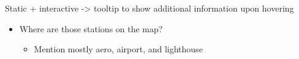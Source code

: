 \documentclass[
]{jss}
\providecommand{\tightlist}{%
  \setlength{\itemsep}{0pt}\setlength{\parskip}{0pt}}
\begin{document}
Static + interactive -\textgreater{} tooltip to show additional
information upon hovering

\begin{itemize}
\tightlist
\item
  Where are those stations on the map?

  \begin{itemize}
  \tightlist
  \item
    Mention mostly aero, airport, and lighthouse
  \end{itemize}
\end{itemize}

\renewcommand\refname{Summary}

\end{document}
